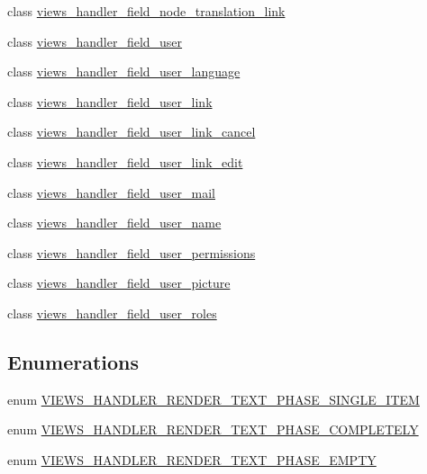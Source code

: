 \begin{DoxyCompactItemize}
\item 
class \hyperlink{classviews__handler__field__node__translation__link}{views\_\-handler\_\-field\_\-node\_\-translation\_\-link}
\item 
class \hyperlink{classviews__handler__field__user}{views\_\-handler\_\-field\_\-user}
\item 
class \hyperlink{classviews__handler__field__user__language}{views\_\-handler\_\-field\_\-user\_\-language}
\item 
class \hyperlink{classviews__handler__field__user__link}{views\_\-handler\_\-field\_\-user\_\-link}
\item 
class \hyperlink{classviews__handler__field__user__link__cancel}{views\_\-handler\_\-field\_\-user\_\-link\_\-cancel}
\item 
class \hyperlink{classviews__handler__field__user__link__edit}{views\_\-handler\_\-field\_\-user\_\-link\_\-edit}
\item 
class \hyperlink{classviews__handler__field__user__mail}{views\_\-handler\_\-field\_\-user\_\-mail}
\item 
class \hyperlink{classviews__handler__field__user__name}{views\_\-handler\_\-field\_\-user\_\-name}
\item 
class \hyperlink{classviews__handler__field__user__permissions}{views\_\-handler\_\-field\_\-user\_\-permissions}
\item 
class \hyperlink{classviews__handler__field__user__picture}{views\_\-handler\_\-field\_\-user\_\-picture}
\item 
class \hyperlink{classviews__handler__field__user__roles}{views\_\-handler\_\-field\_\-user\_\-roles}
\end{DoxyCompactItemize}
\subsection*{Enumerations}
\begin{DoxyCompactItemize}
\item 
enum \hyperlink{group__views__field__handlers_gaa1014f79648c5c78750110efa0437397}{VIEWS\_\-HANDLER\_\-RENDER\_\-TEXT\_\-PHASE\_\-SINGLE\_\-ITEM} 
\item 
enum \hyperlink{group__views__field__handlers_ga9e79d8dea50ce8dff131afa22ecfac41}{VIEWS\_\-HANDLER\_\-RENDER\_\-TEXT\_\-PHASE\_\-COMPLETELY} 
\item 
enum \hyperlink{group__views__field__handlers_ga0a388e031abd2ce00c90925a940235c9}{VIEWS\_\-HANDLER\_\-RENDER\_\-TEXT\_\-PHASE\_\-EMPTY} 
\end{DoxyCompactItemize}



